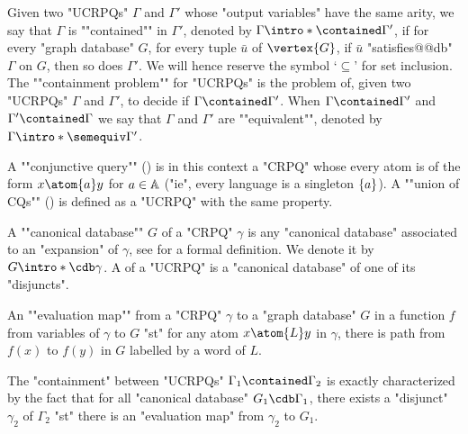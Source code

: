 \AP Given two "UCRPQs" $\Gamma$
and $\Gamma'$ whose "output variables" have the same arity,
we say that $\Gamma$ is \AP""contained"" in $\Gamma'$,
denoted by $\Gamma \intro*\contained \Gamma'$, if
for every "graph database" $G$, for every tuple $\bar u$ of $\vertex{G}$,
if $\bar u$ "satisfies@@db" $\Gamma$ on $G$, then so does $\Gamma'$. We will hence reserve the symbol `$\subseteq$' for set inclusion.
The \AP""containment problem"" for "UCRPQs" is the problem of, given
two "UCRPQs" $\Gamma$ and $\Gamma'$, to decide if $\Gamma \contained \Gamma'$.
When $\Gamma \contained \Gamma'$ and $\Gamma' \contained \Gamma$  we say that
$\Gamma$ and $\Gamma'$ are \AP""equivalent"", denoted by
$\Gamma \intro*\semequiv \Gamma'$. 

\AP A ""conjunctive query"" () is in this context a "CRPQ" whose every atom is of the form $x \atom{a} y$ for $a \in \mathbb{A}$ ("ie", every language is a singleton $\{a\}$).
\AP A ""union of CQs"" () is defined as a "UCRPQ" with the same property.

A \AP""canonical database"" $G$ of a "CRPQ" $\gamma$ is any "canonical database" associated
to an "expansion" of $\gamma$, see \cite[Definition 3.1]{FlorescuLevySuciu1998Containment}
for a formal definition. We denote it by \AP$G \intro*\cdb \gamma$.
A  of a "UCRPQ" is a "canonical database" of one
of its "disjuncts".

An \AP""evaluation map"" from a "CRPQ" $\gamma$ to a "graph database" $G$
in a function $f$ from variables of $\gamma$ to $G$ "st"
for any atom $x \atom{L} y$ in $\gamma$, there is path from $f(x)$ to $f(y)$ in $G$
labelled by a word of $L$.

The "containment" between "UCRPQs" $\Gamma_1 \contained \Gamma_2$ is exactly characterized
by the fact that for all "canonical database" $G_1 \cdb \Gamma_1$,
there exists a "disjunct" $\gamma_2$ of $\Gamma_2$ "st" there is an "evaluation map"
from $\gamma_2$ to $G_1$.


